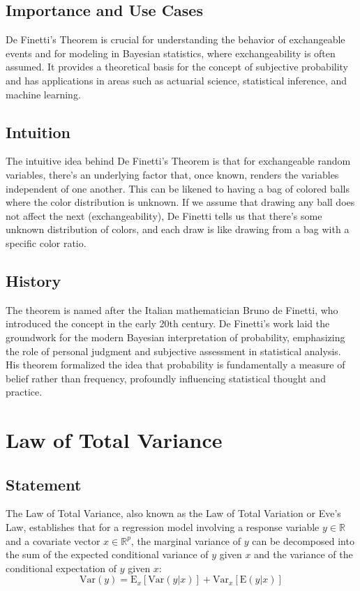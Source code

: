 \documentclass{article}
\begin{document}
\subsection{Importance and Use Cases}
De Finetti's Theorem is crucial for understanding the behavior of exchangeable events and for modeling in Bayesian statistics, where exchangeability is often assumed. It provides a theoretical basis for the concept of subjective probability and has applications in areas such as actuarial science, statistical inference, and machine learning.

\subsection{Intuition}
The intuitive idea behind De Finetti's Theorem is that for exchangeable random variables, there's an underlying factor that, once known, renders the variables independent of one another. This can be likened to having a bag of colored balls where the color distribution is unknown. If we assume that drawing any ball does not affect the next (exchangeability), De Finetti tells us that there's some unknown distribution of colors, and each draw is like drawing from a bag with a specific color ratio.

\subsection{History}
The theorem is named after the Italian mathematician Bruno de Finetti, who introduced the concept in the early 20th century. De Finetti's work laid the groundwork for the modern Bayesian interpretation of probability, emphasizing the role of personal judgment and subjective assessment in statistical analysis. His theorem formalized the idea that probability is fundamentally a measure of belief rather than frequency, profoundly influencing statistical thought and practice.

\section{Law of Total Variance}

\subsection{Statement}
The Law of Total Variance, also known as the Law of Total Variation or Eve's Law, establishes that for a regression model involving a response variable \( y \in \mathbb{R} \) and a covariate vector \( x \in \mathbb{R}^p \), the marginal variance of \( y \) can be decomposed into the sum of the expected conditional variance of \( y \) given \( x \) and the variance of the conditional expectation of \( y \) given \( x \):
\[ \text{Var}(y) = \text{E}_x[\text{Var}(y|x)] + \text{Var}_x[\text{E}(y|x)] \]
\end{document}
